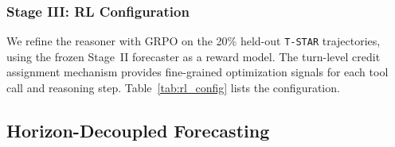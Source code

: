 \documentclass[11pt]{article}
\begin{document}
\subsubsection{Stage III: RL Configuration}

We refine the reasoner with GRPO on the 20\% held-out \texttt{T-STAR} trajectories, using the frozen Stage~II forecaster as a reward model.
The turn-level credit assignment mechanism provides fine-grained optimization signals for each tool call and reasoning step.
Table~\ref{tab:rl_config} lists the configuration.

\begin{table}[htbp]
\centering
\caption{Configuration for Stage~III RL.}
\label{tab:rl_config}
\end{table}

\subsection{Horizon-Decoupled Forecasting}
\label{app:horizon}
\end{document}
